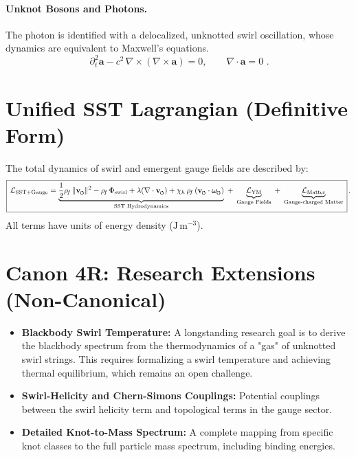 \documentclass[11pt]{article}
\newcommand{\swirlarrow}{%
    \mathchoice{\mkern-2mu\scriptstyle\boldsymbol{\circlearrowleft}}%
    {\mkern-2mu\scriptstyle\boldsymbol{\circlearrowleft}}%
    {\mkern-2mu\scriptscriptstyle\boldsymbol{\circlearrowleft}}%
    {\mkern-2mu\scriptscriptstyle\boldsymbol{\circlearrowleft}}%
}
\newcommand{\vswirl}{\mathbf{v}_{\swirlarrow}}
\newcommand{\omegas}{\boldsymbol{\omega}_{\swirlarrow}}  %
\newcommand{\rhof}{\rho_{\!f}}                           %
\begin{document}
\paragraph{Unknot Bosons and Photons.}
    The photon is identified with a delocalized, unknotted swirl oscillation, whose dynamics are equivalent to Maxwell's equations.
    \[ \boxed{\,\partial_t^2 \mathbf{a} - c^2\,\nabla\times(\nabla\times \mathbf{a}) = 0, \qquad \nabla\cdot \mathbf{a}=0\,}\,. \]

    \appendix

\section{Unified SST Lagrangian (Definitive Form)}
\label{sec:lagrangian}
The total dynamics of swirl and emergent gauge fields are described by:
\[
    \boxed{\,\mathcal{L}_{\text{SST+Gauge}}
        =
        \underbrace{\frac{1}{2}\rhof\,\|\vswirl\|^2
        - \rhof\,\Phi_{\text{swirl}}
            + \lambda(\nabla\cdot\vswirl)
            + \chi_h\,\rhof\,(\vswirl\cdot\omegas)}_{\text{SST Hydrodynamics}}
        \;+\;
        \underbrace{\mathcal{L}_{\text{YM}}}_{\text{Gauge Fields}}
        \;+\;
        \underbrace{\mathcal{L}_{\text{Matter}}}_{\text{Gauge-charged Matter}}
        \,}\,.
\]
All terms have units of energy density ($\mathrm{J\,m^{-3}}$).

\section{Canon 4R: Research Extensions (Non-Canonical)}
\begin{itemize}
\item \textbf{Blackbody Swirl Temperature:} A longstanding research goal is to derive the blackbody spectrum from the thermodynamics of a "gas" of unknotted swirl strings. This requires formalizing a swirl temperature and achieving thermal equilibrium, which remains an open challenge.
\item \textbf{Swirl-Helicity and Chern-Simons Couplings:} Potential couplings between the swirl helicity term and topological terms in the gauge sector.
\item \textbf{Detailed Knot-to-Mass Spectrum:} A complete mapping from specific knot classes to the full particle mass spectrum, including binding energies.
\end{itemize}
\end{document}
